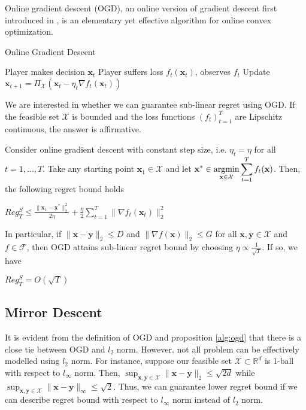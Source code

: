 \documentclass[12pt, a4paper]{report}
\begin{document}
Online gradient descent (OGD), an online version of gradient descent first introduced in \cite{Zinkevich2003OnlineCP}, is an elementary yet effective algorithm for online convex optimization. 
\begin{algorithm}
\caption{Online Gradient Descent}\label{alg:ogd}
\begin{algorithmic}[1]
\State Player makes decision $\mathbf{x}_t$
\State Player suffers loss $f_t(\mathbf{x}_t)$, observes $f_t$
\State Update $\mathbf{x}_{t+1} = \Pi_{\mathcal{X}} (\mathbf{x}_t - \eta_t \nabla f_t(\mathbf{x}_t))$
\EndFor
\end{algorithmic}
\end{algorithm}

We are interested in whether we can guarantee sub-linear regret using OGD. If the feasible set $\mathcal{X}$ is bounded and the loss functions $(f_t)_{t=1}^T$ are Lipschitz continuous, the answer is affirmative.

\begin{prop} \label{prop:ogd-bound}
Consider online gradient descent with constant step size, i.e. $\eta_t = \eta$ for all $t = 1, \dots, T$. Take any starting point $\mathbf{x}_1 \in \mathcal{X}$ and let $\displaystyle \mathbf{x}^{*} \in \operatorname*{argmin}_{\mathbf{x} \in \mathcal{X}} \sum_{t=1}^{T} f_t(\mathbf{x})$. Then, the following regret bound holds 
\begin{center}
    $\displaystyle Reg_T^S \leq \frac{\lVert \mathbf{x}_1 - \mathbf{x}^{*} \rVert_2^2}{2\eta} + \frac{\eta}{2}\sum_{t=1}^{T} \lVert \nabla f_t(\mathbf{x}_t) \rVert_2^2$
\end{center}
In particular, if $\lVert \mathbf{x} - \mathbf{y} \rVert_2 \leq D$ and $\lVert \nabla f(\mathbf{x}) \rVert_2 \leq G$ for all $\mathbf{x}, \mathbf{y} \in \mathcal{X}$ and $f \in \mathcal{F}$, then OGD attains sub-linear regret bound by choosing $\eta \propto \frac{1}{\sqrt{T}}$. If so, we have
\begin{center}
    $Reg_T^S = O(\sqrt{T})$
\end{center}
\end{prop}



\subsection{Mirror Descent}

It is evident from the definition of OGD and proposition \ref{alg:ogd} that there is a close tie between OGD and $l_2$ norm.
However, not all problem can be effectively modelled using $l_2$ norm. For instance, suppose our feasible set $\mathcal{X} \subset \mathbb{R}^d$ is 1-ball with respect to $l_\infty$ norm. Then, $\sup_{\mathbf{x}, \mathbf{y} \in \mathcal{X}} \lVert \mathbf{x} - \mathbf{y} \rVert_2 \leq \sqrt{2d}$ while $\sup_{\mathbf{x}, \mathbf{y} \in \mathcal{X}} \lVert \mathbf{x} - \mathbf{y} \rVert_{\infty} \leq \sqrt{2}$. Thus, we can guarantee lower regret bound if we can describe regret bound with respect to $l_\infty$ norm instead of $l_2$ norm. 
\end{document}
